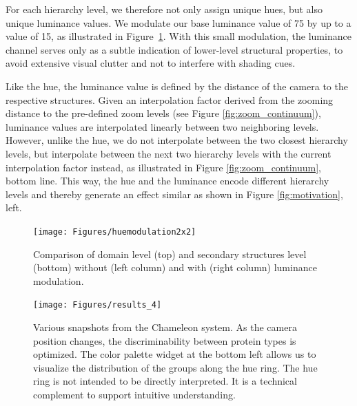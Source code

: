 \documentclass{egpubl}
\begin{document}
	
	For each hierarchy level, we therefore not only assign unique hues, but also unique luminance values. 
	We modulate our base luminance value of 75 by up to a value of 15, as illustrated in Figure~\ref{fig:results_2}.  
	With this small modulation, the luminance channel serves only as a subtle indication of lower-level structural properties, to avoid extensive visual clutter and not to interfere with shading cues.  
	
	Like the hue, the luminance value is defined by the distance of the camera to the respective structures. 
	Given an interpolation factor derived from the zooming distance to the pre-defined zoom levels (see Figure \ref{fig:zoom_continuum}), luminance values are interpolated linearly between two neighboring levels. 
	However, unlike the hue, we do not interpolate between the two closest hierarchy levels, but interpolate between the next two hierarchy levels with the current interpolation factor instead, as illustrated in Figure \ref{fig:zoom_continuum}, bottom line. 
	This way, the hue and the luminance encode different hierarchy levels and thereby generate an effect similar as shown in Figure \ref{fig:motivation}, left. 
				
	\begin{figure}[t]
		\centering
		\texttt{[image: Figures/huemodulation2x2]}
		\caption{Comparison of domain level (top) and secondary structures level (bottom) without (left column) and with (right column) luminance modulation. }
		\label{fig:results_2}
	\end{figure}
	
	\begin{figure}[t]
		\centering
		\texttt{[image: Figures/results\_4]}
		\caption{Various snapshots from the Chameleon system.
			As the camera position changes, the discriminability between protein types is optimized.
			The color palette widget at the bottom left allows us to visualize the distribution of the groups along the hue ring. The hue ring is not intended to be directly interpreted. It is a technical complement to support intuitive understanding.}
		\label{fig:results_1}
	\end{figure}
	
\end{document}
